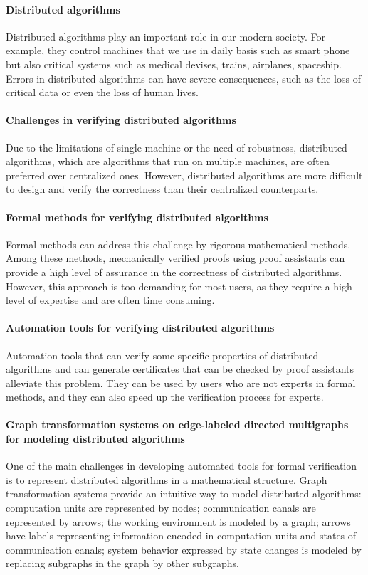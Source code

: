 
\paragraph{Distributed algorithms} Distributed algorithms play an important role in our modern society. For example, they control machines that we use in daily basis such as smart phone but also critical systems such as medical devises, trains, airplanes, spaceship. Errors in distributed algorithms can have severe consequences, such as the loss of critical data or even the loss of human lives. 


\paragraph{Challenges in verifying distributed algorithms}
Due to the limitations of single machine or the need of robustness, distributed algorithms, which are algorithms that run on multiple machines, are often preferred over centralized ones. However, distributed algorithms are more difficult to design and verify the correctness than their centralized counterparts. 

\paragraph{Formal methods for verifying distributed algorithms}
Formal methods can address this challenge by rigorous mathematical methods. Among these methods, mechanically verified proofs using proof assistants can provide a high level of assurance in the correctness of distributed algorithms.
However, this approach is too demanding for most users, as they require a high level of expertise and are often time consuming.  

\paragraph{Automation tools for verifying distributed algorithms}
Automation tools that can verify some specific properties of distributed algorithms and can generate certificates that can be checked by proof assistants alleviate this problem. 
 They can be used by users who are not experts in formal methods, and they can also speed up the verification process for experts.

 \paragraph{Graph transformation systems on edge-labeled directed multigraphs
 for modeling distributed algorithms}
 One of the main challenges in developing automated tools for formal verification is to represent distributed algorithms in a mathematical structure. Graph transformation systems provide an intuitive way to model distributed algorithms: computation units are represented by nodes; communication canals are represented by arrows; the working environment is modeled by a graph; arrows have labels representing information encoded in computation units and states of communication canals; system behavior expressed by state changes is modeled by replacing subgraphs in the graph by other subgraphs. 

